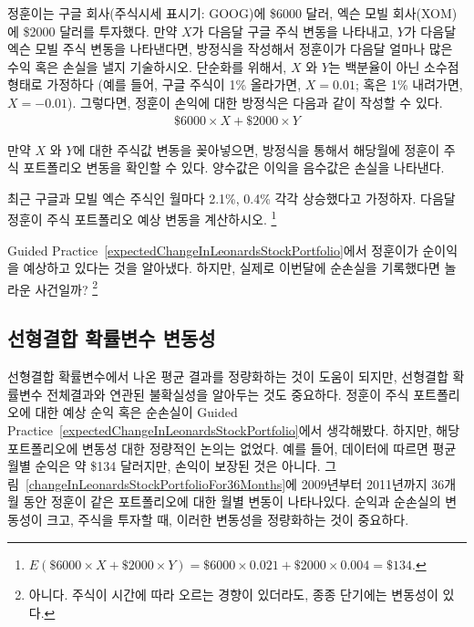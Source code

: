 \begin{example}{
정훈이는 구글 회사(주식시세 표시기: GOOG)에 \$6000 달러, 엑슨 모빌 회사(XOM)에 \$2000 달러를 투자했다.
만약 $X$가 다음달 구글 주식 변동을 나타내고, $Y$가 다음달 엑슨 모빌 주식 변동을 나타낸다면, 방정식을 작성해서 정훈이가 다음달 얼마나 많은 수익 혹은 손실을 낼지 기술하시오.}
단순화를 위해서, $X$ 와 $Y$는 백분율이 아닌 소수점 형태로 가정하다 (예를 들어, 구글 주식이 1\% 올라가면, $X=0.01$; 혹은 1\% 내려가면, $X=-0.01$). 그렇다면, 정훈이 손익에 대한 방정식은 다음과 같이 작성할 수 있다.
\begin{align*}
\$6000\times X + \$2000\times Y
\end{align*}

만약 $X$ 와 $Y$에 대한 주식값 변동을 꽂아넣으면, 방정식을 통해서 해당월에 정훈이 주식 포트폴리오 변동을 확인할 수 있다. 양수값은 이익을 음수값은 손실을 나타낸다.
\end{example}

\begin{exercise}\label{expectedChangeInLeonardsStockPortfolio}
최근 구글과 모빌 엑슨 주식인 월마다 2.1\%, 0.4\% 각각 상승했다고 가정하자. 다음달 정훈이 주식 포트폴리오 예상 변동을 계산하시오.
\footnote{$E(\$6000\times X + \$2000\times Y) = \$6000\times 0.021 + \$2000\times 0.004 = \$134$.}
\end{exercise}

\begin{exercise}
Guided Practice~\ref{expectedChangeInLeonardsStockPortfolio}에서 정훈이가 순이익을 예상하고 있다는 것을 알아냈다. 하지만, 실제로 이번달에 순손실을 기록했다면 놀라운 사건일까?
\footnote{아니다. 주식이 시간에 따라 오르는 경향이 있더라도, 종종 단기에는 변동성이 있다.}
\end{exercise}

\subsection{선형결합 확률변수 변동성}

선형결합 확률변수에서 나온 평균 결과를 정량화하는 것이 도움이 되지만, 선형결합 확률변수 전체결과와 연관된 불확실성을 알아두는 것도 중요하다. 정훈이 주식 포트폴리오에 대한 예상 순익 혹은 순손실이 Guided Practice~\ref{expectedChangeInLeonardsStockPortfolio}에서 생각해봤다. 하지만, 해당 포트폴리오에 변동성 대한 정량적인 논의는 없었다. 예를 들어, 데이터에 따르면 평균 월별 순익은 약 \$134 달러지만, 손익이 보장된 것은 아니다. 그림~\ref{changeInLeonardsStockPortfolioFor36Months}에 2009년부터 2011년까지 36개월 동안 정훈이 같은 포트폴리오에 대한 월별 변동이 나타나있다. 순익과 순손실의 변동성이 크고, 주식을 투자할 때, 이러한 변동성을 정량화하는 것이 중요하다.

